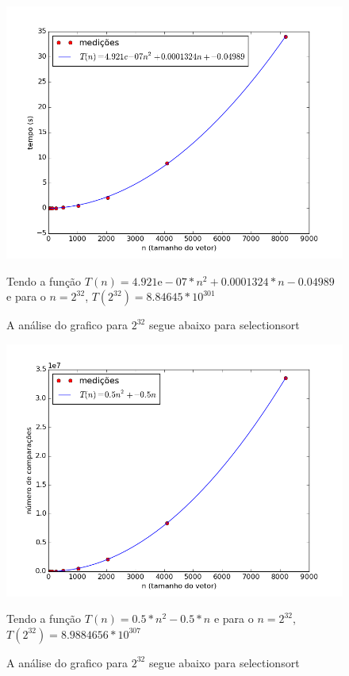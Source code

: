 \documentclass[12pt,a4paper,twoside]{report}
\begin{document}
\clearpage


\begin{figure}[ht]
\centering \includegraphics[scale=0.8]{../selectionsort/imagens/selectionsortQuaseCresc300.png}
\caption{A análise do grafico para $2^{32}$ segue abaixo para selectionsort}

Tendo a função $T(n) = 4.921\mathrm{e}-07*n^{2}+0.0001324*n-0.04989$ e para o $n =2^{32}$, $T(2^{32}) = 8.84645*10^{301}$
\label{fig:selectionsortQuaseCresc300}
\end{figure}

\begin{figure}[ht]
\centering \includegraphics[scale=0.8]{../selectionsort/imagens/selectionsortQuaseCresc301.png}
\caption{A análise do grafico para $2^{32}$ segue abaixo para selectionsort}

Tendo a função $T(n) = 0.5*n^{2}-0.5*n$ e para o $n =2^{32}$, $T(2^{32}) =8.9884656 * 10^{307}$
\label{fig:selectionsortQuaseCresc301}
\end{figure}
\end{document}
